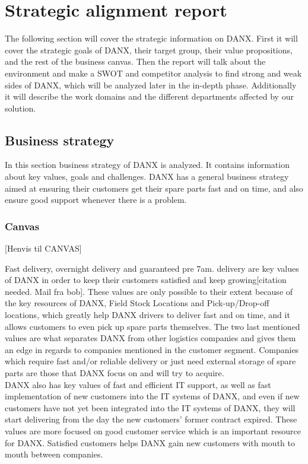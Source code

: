 \chapter{Strategic alignment report}
The following section will cover the strategic information on DANX. First it will cover the strategic goals of DANX, their target group, their value propositions, and the rest of the business canvas. 
Then the report will talk about the environment and make a SWOT and competitor analysis to find strong and weak sides of DANX, which will be analyzed later in the in-depth phase.
Additionally it will describe the work domains and the different departments affected by our solution.

\section{Business strategy}
In this section business strategy of DANX is analyzed. It contains information about key values, goals and challenges.
DANX has a general business strategy aimed at ensuring their customers get their spare parts fast and on time, and also ensure good support whenever there is a problem.

\subsection{Canvas}

[Henvis til CANVAS]

Fast delivery, overnight delivery and guaranteed pre 7am. delivery are key values of DANX in order to keep their customers satisfied and keep growing[citation needed. Mail fra bob]. These values are only possible to their extent because of the key resources of DANX, Field Stock Locations and Pick-up/Drop-off locations, which greatly help DANX drivers to deliver fast and on time, and it allows customers to even pick up spare parts themselves. The two last mentioned values are what separates DANX from other logistics companies and gives them an edge in regards to companies mentioned in the customer segment. Companies which require fast and/or reliable delivery or just need external storage of spare parts are those that DANX focus on and will try to acquire.\\
DANX also has key values of fast and efficient IT support, as well as fast implementation of new customers into the IT systems of DANX, and even if new customers have not yet been integrated into the IT systems of DANX, they will start delivering from the day the new customers' former contract expired. These values are more focused on good customer service which is an important resource for DANX. Satisfied customers helps DANX gain new customers with mouth to mouth between companies.

